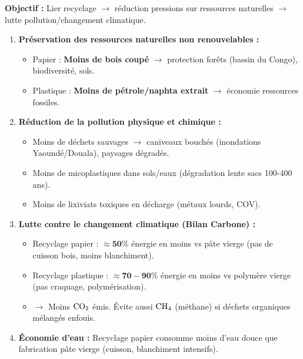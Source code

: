 \documentclass[11pt]{article}
\newcommand{\cle}[1]{{\popxbold\color{popdark}#1}}
\begin{document}
\begin{methode}
\textbf{Objectif :} Lier recyclage $\rightarrow$ réduction pressions sur ressources naturelles $\rightarrow$ lutte pollution/changement climatique.
\begin{enumerate}
    \item \textbf{Préservation des ressources naturelles non renouvelables :}
    \begin{itemize}
        \item Papier : \textbf{Moins de bois coupé} $\rightarrow$ protection forêts (bassin du Congo), biodiversité, sols.
        \item Plastique : \textbf{Moins de pétrole/naphta extrait} $\rightarrow$ économie ressources fossiles.
    \end{itemize}
    \item \textbf{Réduction de la pollution physique et chimique :}
    \begin{itemize}
        \item Moins de déchets sauvages $\rightarrow$ caniveaux bouchés (inondations Yaoundé/Douala), paysages dégradés.
        \item Moins de \cle{micoplastiques} dans sols/eaux (dégradation lente sacs 100-400 ans).
        \item Moins de \cle{lixiviats} toxiques en décharge (métaux lourds, COV).
    \end{itemize}
    \item \textbf{Lutte contre le changement climatique (Bilan Carbone) :}
    \begin{itemize}
        \item Recyclage papier : $\approx \mathbf{50\%}$ énergie en moins vs pâte vierge (pas de cuisson bois, moins blanchiment).
        \item Recyclage plastique : $\approx \mathbf{70-90\%}$ énergie en moins vs polymère vierge (pas craquage, polymérisation).
        \item $\rightarrow$ Moins $\ce{CO2}$ émis. Évite aussi $\ce{CH4}$ (méthane) si déchets organiques mélangés enfouis.
    \end{itemize}
    \item \textbf{Économie d'eau :} Recyclage papier consomme moins d'eau douce que fabrication pâte vierge (cuisson, blanchiment intensifs).
\end{enumerate}
\end{methode}
\end{document}
